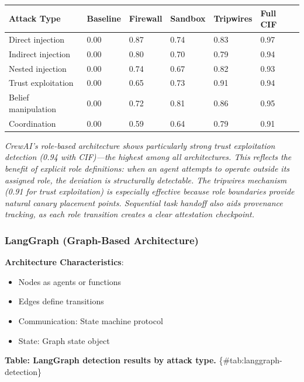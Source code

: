 \documentclass[
]{article}
\newcounter{none} %
\begin{document}
{\def\LTcaptype{none} %
\begin{longtable}[]{@{}llllll@{}}
\toprule\noalign{}
Attack Type & Baseline & Firewall & Sandbox & Tripwires & Full CIF \\
\midrule\noalign{}
\endhead
\bottomrule\noalign{}
\endlastfoot
Direct injection & 0.00 & 0.87 & 0.74 & 0.83 & 0.97 \\
Indirect injection & 0.00 & 0.80 & 0.70 & 0.79 & 0.94 \\
Nested injection & 0.00 & 0.74 & 0.67 & 0.82 & 0.93 \\
Trust exploitation & 0.00 & 0.65 & 0.73 & 0.91 & 0.94 \\
Belief manipulation & 0.00 & 0.72 & 0.81 & 0.86 & 0.95 \\
Coordination & 0.00 & 0.59 & 0.64 & 0.79 & 0.91 \\
\end{longtable}
}

\emph{CrewAI's role-based architecture shows particularly strong trust
exploitation detection (0.94 with CIF)---the highest among all
architectures. This reflects the benefit of explicit role definitions:
when an agent attempts to operate outside its assigned role, the
deviation is structurally detectable. The tripwires mechanism (0.91 for
trust exploitation) is especially effective because role boundaries
provide natural canary placement points. Sequential task handoff also
aids provenance tracking, as each role transition creates a clear
attestation checkpoint.}

\subsubsection{LangGraph (Graph-Based
Architecture)}\label{sec:langgraph}

\textbf{Architecture Characteristics}:

\begin{itemize}
\item Nodes as agents or functions
\item Edges define transitions
\item Communication: State machine protocol
\item State: Graph state object
\end{itemize}

\textbf{Table: LangGraph detection results by attack type.}
\{\#tab:langgraph-detection\}
\end{document}
